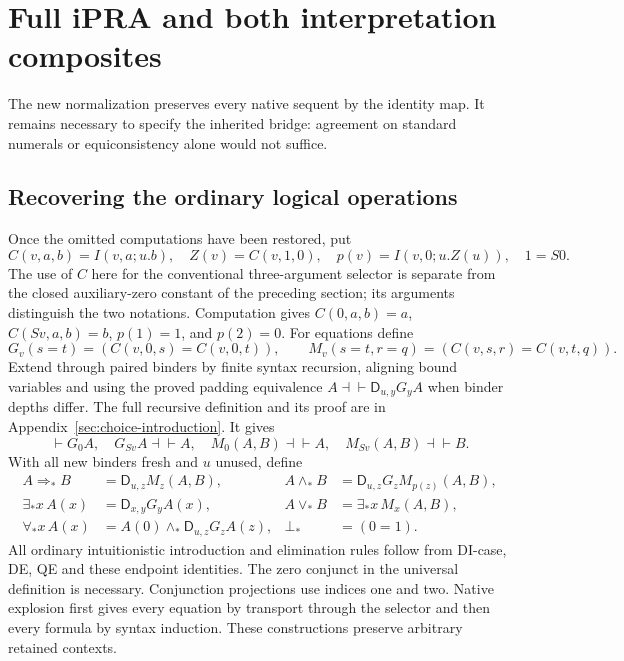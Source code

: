 \documentclass[11pt,letterpaper]{article}
\theoremstyle{definition}\newtheorem{definition}[theorem]{Definition}
\theoremstyle{remark}\newtheorem{remark}[theorem]{Remark}
\newcommand{\D}{\mathsf D}
\begin{document}


\section{Full iPRA and both interpretation composites}
\label{sec:bridge}

The new normalization preserves every native sequent by the identity
map. It remains necessary to specify the inherited bridge: agreement
on standard numerals or equiconsistency alone would not suffice.

\subsection{Recovering the ordinary logical operations}

Once the omitted computations have been restored, put
\[
 C(v,a,b)=I(v,a;u.b),\quad
 Z(v)=C(v,1,0),\quad p(v)=I(v,0;u.Z(u)),\quad 1=S0.
\]
The use of $C$ here for the conventional three-argument selector is
separate from the closed auxiliary-zero constant of the preceding
section; its arguments distinguish the two notations. Computation gives
$C(0,a,b)=a$, $C(Sv,a,b)=b$, $p(1)=1$, and $p(2)=0$.
For equations define
\[
 G_v(s=t)=(C(v,0,s)=C(v,0,t)),\qquad
 M_v(s=t,r=q)=(C(v,s,r)=C(v,t,q)).
\]
Extend through paired binders by finite syntax recursion, aligning bound
variables and using the proved padding equivalence
$A\dashv\vdash\D_{u,y}G_yA$ when binder depths differ. The full recursive
definition and its proof are in Appendix~\ref{sec:choice-introduction}.
It gives
\[
 \vdash G_0A,\quad G_{Sv}A\dashv\vdash A,\quad
 M_0(A,B)\dashv\vdash A,\quad M_{Sv}(A,B)\dashv\vdash B.
\]
With all new binders fresh and $u$ unused, define
\begin{align*}
 A\Rightarrow_*B&=\D_{u,z}M_z(A,B), &
 A\wedge_*B&=\D_{u,z}G_zM_{p(z)}(A,B),\\
 \exists_*x\,A(x)&=\D_{x,y}G_yA(x), &
 A\vee_*B&=\exists_*x\,M_x(A,B),\\
 \forall_*x\,A(x)&=A(0)\wedge_*\D_{u,z}G_zA(z), &
 \bot_*&=(0=1).
\end{align*}
All ordinary intuitionistic introduction and elimination rules follow
from DI-case, DE, QE and these endpoint identities. The zero conjunct
in the universal definition is necessary. Conjunction projections use
indices one and two. Native explosion first gives every equation by
transport through the selector and then every formula by syntax induction.
These constructions preserve arbitrary retained contexts.
\end{document}
